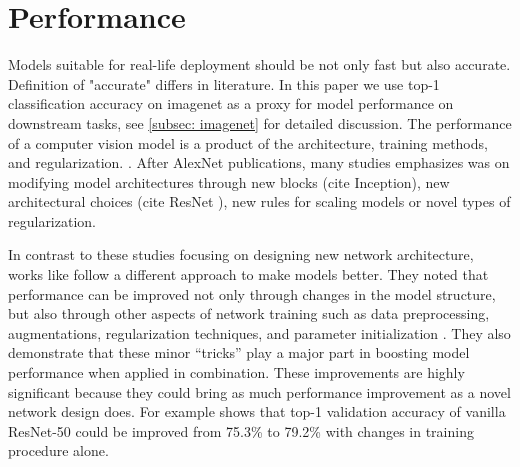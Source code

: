 \chapter{Performance} \label{chap:performance}

Models suitable for real-life deployment should be not only fast but also accurate. Definition of "accurate" differs in literature. In this paper we use top-1 classification accuracy on imagenet as a proxy for model performance on downstream tasks, see \autoref{subsec: imagenet} for detailed discussion. 
The performance of a computer vision model is a product of the architecture, training methods, and regularization. \cite{lee2020_compounding_improvements}. 
After AlexNet \cite{krizhevsky2012_imagenet_alexnet} publications, many studies emphasizes was on modifying model architectures through new blocks (cite Inception), new architectural choices (cite ResNet ), new rules for scaling models \cite{tan2019_efficientnet} or novel types of regularization. \cite{zhang2017_mixup} \cite{yun2019_cutmix}


In contrast to these studies focusing on designing new network architecture, works like \cite{he2019_bag_of_tricks} follow a different approach to make models better. 
They noted that performance can be improved not only through changes in the model structure, but also through other aspects of network training such as data preprocessing, augmentations, regularization techniques, and parameter initialization \cite{brock2021_nfnet}. They also demonstrate that these minor “tricks” play a major part in boosting model performance when applied in combination. These improvements are highly significant because they could bring as much performance improvement as a novel network design does. For example \cite{he2019_bag_of_tricks} shows that top-1 validation accuracy of vanilla ResNet-50 could be improved from 75.3\% to 79.2\% with changes in training procedure alone. 




